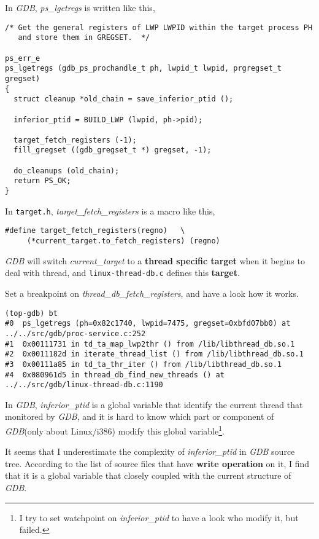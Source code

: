 In \emph{GDB}, \emph{ps\_lgetregs} is written like this,
\begin{verbatim}
/* Get the general registers of LWP LWPID within the target process PH
   and store them in GREGSET.  */

ps_err_e
ps_lgetregs (gdb_ps_prochandle_t ph, lwpid_t lwpid, prgregset_t gregset)
{
  struct cleanup *old_chain = save_inferior_ptid ();

  inferior_ptid = BUILD_LWP (lwpid, ph->pid);

  target_fetch_registers (-1);
  fill_gregset ((gdb_gregset_t *) gregset, -1);

  do_cleanups (old_chain);
  return PS_OK;
}
\end{verbatim}
In \texttt{target.h}, \emph{target\_fetch\_registers} is a macro like this,
\begin{verbatim}
#define	target_fetch_registers(regno)	\
     (*current_target.to_fetch_registers) (regno)
\end{verbatim}

\emph{GDB} will switch \emph{current\_target} to a \textbf{thread specific target} when it begins
to deal with thread, and \texttt{linux-thread-db.c} defines this \textbf{target}.

Set a breakpoint on \emph{thread\_db\_fetch\_registers}, and have a look how it works.
\begin{verbatim}
(top-gdb) bt
#0  ps_lgetregs (ph=0x82c1740, lwpid=7475, gregset=0xbfd07bb0) at ../../src/gdb/proc-service.c:252
#1  0x00111731 in td_ta_map_lwp2thr () from /lib/libthread_db.so.1
#2  0x0011182d in iterate_thread_list () from /lib/libthread_db.so.1
#3  0x00111a85 in td_ta_thr_iter () from /lib/libthread_db.so.1
#4  0x080961d5 in thread_db_find_new_threads () at ../../src/gdb/linux-thread-db.c:1190
\end{verbatim}

In \emph{GDB}, \emph{inferior\_ptid} is a global variable that identify the current thread that monitored
by \emph{GDB}, and it is hard to know which part or component of \emph{GDB}(only about Linux/i386) modify this global variable\footnote{
I try to set watchpoint on \emph{inferior\_ptid} to have a look who modify it, but failed.}.

It seems that I underestimate the complexity of \emph{inferior\_ptid} in \emph{GDB} source tree.  According
to the list of source files that have \textbf{write operation} on it, I find that it is a global variable
that closely coupled with the current structure of \emph{GDB}.

